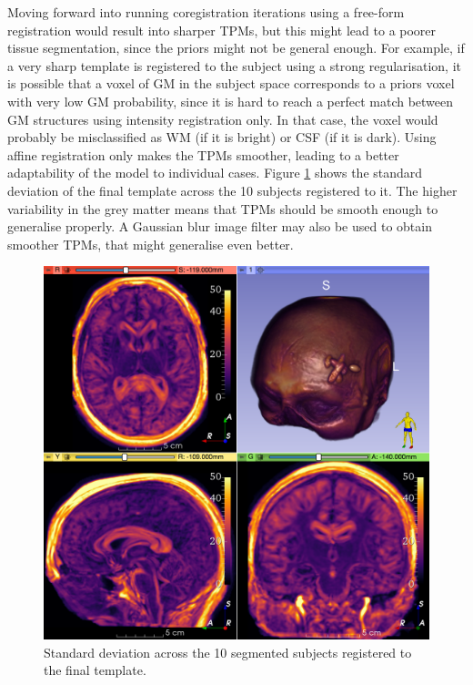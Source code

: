Moving forward into running coregistration iterations using a free-form registration would result into sharper TPMs, but this might lead to a poorer tissue segmentation, since the priors might not be general enough. For example, if a very sharp template is registered to the subject using a strong regularisation, it is possible that a voxel of GM in the subject space corresponds to a priors voxel with very low GM probability, since it is hard to reach a perfect match between GM structures using intensity registration only. In that case, the voxel would probably be misclassified as WM (if it is bright) or CSF (if it is dark). Using affine registration only makes the TPMs smoother, leading to a better adaptability of the model to individual cases. Figure \ref{fig:template-std} shows the standard deviation of the final template across the 10 subjects registered to it. The higher variability in the grey matter means that TPMs should be smooth enough to generalise properly. A Gaussian blur image filter may also be used to obtain smoother TPMs, that might generalise even better.

\begin{figure}
  \includegraphics[width=\textwidth]{figures/affine_9_std}
  \centering
  \caption{Standard deviation across the 10 segmented subjects registered to the final template.}
  \label{fig:template-std}
\end{figure}
